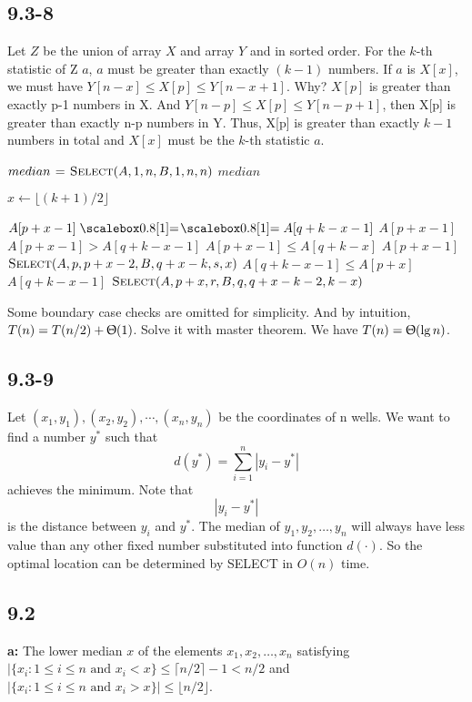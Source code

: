 \documentclass{book}
\begin{document}
\begin{CJK}{UTF8}{gkai}
\subsection*{9.3-8}
Let $Z$ be the union of array $X$ and array $Y$ and in sorted order. For the 
$k$-th statistic of Z $a$, $a$ must be greater than exactly $(k-1)$ numbers. If 
$a$ is $X[x]$, we must have $Y[n-x] \leq X[p] \leq Y[n-x+1]$.  Why?  $X[p]$ is 
greater than exactly p-1 numbers in X. And $Y[n-p] \leq X[p] \leq Y[n-p+1]$, 
then X[p] is greater than exactly n-p numbers in Y.  Thus, X[p] is greater than 
exactly $k-1$ numbers in total and $X[x]$ must be the $k$-th statistic $a$.
\begin{codebox}
\li $median \mathrel{\hspace{1pt}=\hspace{1pt}} \textnormal{\scshape Select}(A,1,n,B,1,n,n)$
\li \Return $median$
\end{codebox}

\begin{codebox}
\li $x \gets \lfloor(k+1)/2\rfloor$

\li \If $A[p+x-1] \isequal A[q+k-x-1]$
\li \Then \Return $A[p+x-1]$
\li \ElseIf $A[p+x-1] > A[q+k-x-1]$
\li \Then \If $A[p+x-1] \le A[q+k-x]$
\li \Then \Return $A[p+x-1]$
\li \Else $\textnormal{\scshape Select}(A, p, p+x-2, B, q+x-k, s,x)$
\End
\li \Else \If $A[q+k-x-1] \le A[p+x]$
\li \Then \Return $A[q+k-x-1]$
\li \Else $\textnormal{\scshape Select}(A, p+x, r, B, q, q+x-k-2,k-x)$
\End
\End
\end{codebox}

Some boundary case checks are omitted for simplicity. And by intuition, $T(n) = 
T(n/2) + \Uptheta(1)$. Solve it with master theorem. We have $T(n) = 
\Uptheta(\lg n)$.

\subsection*{9.3-9}
Let $(x_1, y_1), (x_2, y_2), \cdots, (x_n, y_n)$ be the coordinates of n wells. 
We want to find a number $y^*$ such that $$d(y^*) = \sum_{i = 1}^n |y_i - y^*|$$ 
achieves the minimum. Note that $$|y_i - y^*|$$ is the distance between $y_i$ 
and $y^*$. The median of $y_1, y_2, \ldots, y_n$ will always have less value 
than any other fixed number substituted into function $d(\cdot)$. So the optimal 
location can be determined by SELECT in $O(n)$ time.

\subsection*{9.2}
\textbf{a:} The lower median $x$ of the elements $x_1,x_2,\dots,x_n$ satisfying 
$|\{x_i: 1\le i \le n \text{ and } x_i < x\} \le \lceil n/2 \rceil -1 < n/2$ and 
$|\{x_i: 1\le i \le n \text{ and } x_i > x\}| \le \lfloor n/2 \rfloor$.


\end{CJK}
\end{document}
